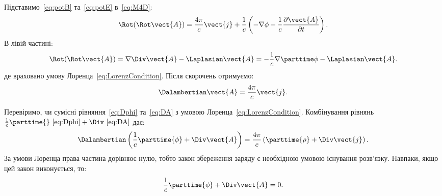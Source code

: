 Підставимо~\eqref{eq:potB} та~\eqref{eq:potE} в~\eqref{eq:M4D}:
\begin{equation*}
	\Rot(\Rot\vect{A}) = \frac{4\pi}{c}\vect{j}
	+ \frac{1}{c}\left( -\nabla \phi - \frac{1}{c}\frac{\partial \vect{A}}{\partial t} \right).
\end{equation*}
В лівій частині:
\begin{equation*}
	\Rot(\Rot\vect{A}) = \nabla \Div\vect{A} - \Laplasian\vect{A} = -\frac1c \nabla \parttime\phi - \Laplasian\vect{A}.
\end{equation*}
де враховано умову Лоренца~\eqref{eq:LorenzCondition}. Після скорочень отримуємо:
\begin{equation}\label{eq:DA}
	\Dalambertian  \vect{A} = \frac{4\pi}{c} \vect{j}.
\end{equation}

Перевіримо, чи сумісні рівняння~\eqref{eq:Dphi} та~\eqref{eq:DA} з умовою Лоренца~\eqref{eq:LorenzCondition}.
Комбінування рівнянь $\frac1c \parttime{}~\eqref{eq:Dphi} + \Div~\eqref{eq:DA}$ дає:
\begin{equation}
	\Dalambertian \left( \frac1c \parttime{\phi} + \Div\vect{A} \right) = \frac{4\pi}c \left( \parttime{\rho} + \Div\vect{j}\right)  .
\end{equation}
За умови Лоренца права частина дорівнює нулю, тобто закон збереження заряду є необхідною умовою існування розв'язку.
Навпаки, якщо цей закон виконується, то:
\begin{equation}\label{eq:LorentzCalibr}
	\frac1c \parttime{\phi} + \Div\vect{A} = 0.
\end{equation}

